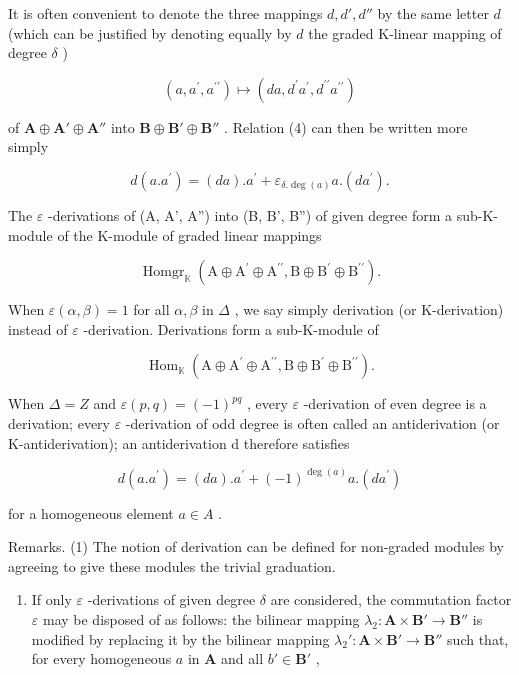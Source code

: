 It is often convenient to denote the three mappings \(d, d', d''\) by the same letter \(d\) (which can be justified by denoting equally by \(d\) the graded K-linear mapping of degree \(\delta\) )

\[
(a, a ^ {\prime}, a ^ {\prime \prime}) \mapsto (d a, d ^ {\prime} a ^ {\prime}, d ^ {\prime \prime} a ^ {\prime \prime})
\]

of \(\mathbf{A} \oplus \mathbf{A}' \oplus \mathbf{A}''\) into \(\mathbf{B} \oplus \mathbf{B}' \oplus \mathbf{B}''\) . Relation (4) can then be written more simply

\[
d (a. a ^ {\prime}) = (d a). a ^ {\prime} + \varepsilon_ {\delta . \deg (a)} a. (d a ^ {\prime}).\tag{5}
\]

The \(\varepsilon\) -derivations of (A, A', A'') into (B, B', B'') of given degree form a sub-K-module of the K-module of graded linear mappings

\[
\operatorname{Homgr} _ {\mathbb {K}} (\mathrm{A} \oplus \mathrm{A} ^ {\prime} \oplus \mathrm{A} ^ {\prime \prime}, \mathrm{B} \oplus \mathrm{B} ^ {\prime} \oplus \mathrm{B} ^ {\prime \prime}).
\]

When \(\varepsilon(\alpha, \beta) = 1\) for all \(\alpha, \beta\) in \(\Delta\) , we say simply derivation (or K-derivation) instead of \(\varepsilon\) -derivation. Derivations form a sub-K-module of

\[
\operatorname{Hom} _ {\mathbb {K}} (\mathrm{A} \oplus \mathrm{A} ^ {\prime} \oplus \mathrm{A} ^ {\prime \prime}, \mathrm{B} \oplus \mathrm{B} ^ {\prime} \oplus \mathrm{B} ^ {\prime \prime}).
\]

When \(\Delta = Z\) and \(\varepsilon(p, q) = (-1)^{pq}\) , every \(\varepsilon\) -derivation of even degree is a derivation; every \(\varepsilon\) -derivation of odd degree is often called an antiderivation (or K-antiderivation); an antiderivation d therefore satisfies

\[
d (a. a ^ {\prime}) = (d a). a ^ {\prime} + (- 1) ^ {\deg (a)} a. (d a ^ {\prime})\tag{6}
\]

for a homogeneous element \(a \in A\) .

Remarks. (1) The notion of derivation can be defined for non-graded modules by agreeing to give these modules the trivial graduation.

\begin{enumerate}
\def\labelenumi{(\arabic{enumi})}
\setcounter{enumi}{1}
\tightlist
\item
  If only \(\varepsilon\) -derivations of given degree \(\delta\) are considered, the commutation factor \(\varepsilon\) may be disposed of as follows: the bilinear mapping \(\lambda_2: \mathbf{A} \times \mathbf{B}' \to \mathbf{B}''\) is modified by replacing it by the bilinear mapping \(\lambda_2': \mathbf{A} \times \mathbf{B}' \to \mathbf{B}''\) such that, for every homogeneous \(a\) in \(\mathbf{A}\) and all \(b' \in \mathbf{B}'\) ,
\end{enumerate}

